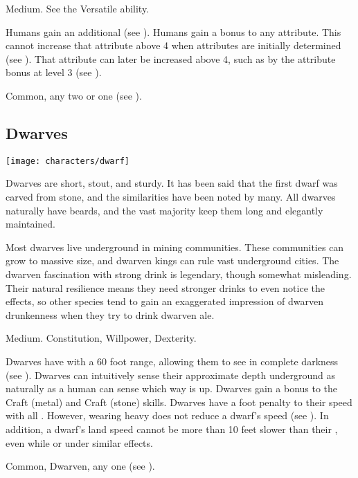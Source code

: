          Medium.
         See the Versatile ability.
        \begin{raggeditemize}
             Humans gain an additional  (see ).
             Humans gain a  bonus to any attribute.
                This cannot increase that attribute above 4 when attributes are initially determined (see ).
                That attribute can later be increased above 4, such as by the attribute bonus at level 3 (see ).
        \end{raggeditemize}
         Common, any two  or one  (see ).

    \subsection{Dwarves}
        \texttt{[image: characters/dwarf]}

        Dwarves are short, stout, and sturdy.
        It has been said that the first dwarf was carved from stone, and the similarities have been noted by many.
        All dwarves naturally have beards, and the vast majority keep them long and elegantly maintained.

        Most dwarves live underground in mining communities.
        These communities can grow to massive size, and dwarven kings can rule vast underground cities.
        The dwarven fascination with strong drink is legendary, though somewhat misleading.
        Their natural resilience means they need stronger drinks to even notice the effects, so other species tend to gain an exaggerated impression of dwarven drunkenness when they try to drink dwarven ale.

         Medium.
          Constitution,  Willpower,  Dexterity.
        \begin{raggeditemize}
             Dwarves have  with a 60 foot range, allowing them to see in complete darkness (see ).
             Dwarves can intuitively sense their approximate depth underground as naturally as a human can sense which way is up.
             Dwarves gain a  bonus to the Craft (metal) and Craft (stone) skills.
             Dwarves have a  foot penalty to their speed with all .
                However, wearing heavy  does not reduce a dwarf's speed (see ).
                In addition, a dwarf's land speed cannot be more than 10 feet slower than their , even while \slowed or under similar effects.
        \end{raggeditemize}
         Common, Dwarven, any one  (see ).

